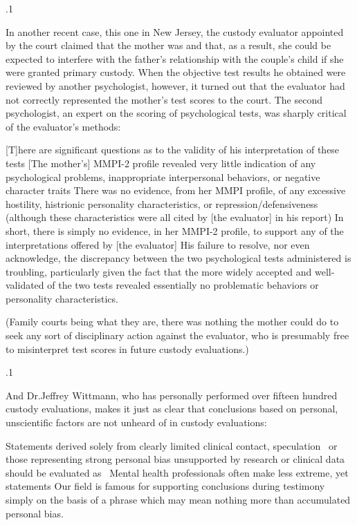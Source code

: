 \documentclass[11pt, twoside]{article}
\begin{document}
{\p.1{%
In another recent case, this one in New Jersey, the custody evaluator
appointed by the court claimed that the mother was  and
that, as a result, she could be expected to interfere with the father’s relationship with the couple’s child if she were granted primary custody.
When the objective test results he obtained were reviewed by another
psychologist, however, it turned out that the evaluator had not correctly
represented the mother’s test scores to the court. The second psychologist, an expert on the scoring of psychological tests, was sharply critical
of the evaluator’s methods:

\begin{blockQuote}
{[T]}here are significant questions as to the validity of his
interpretation of these tests\ellFour{2pt}{2pt} [The mother’s] MMPI-2
profile revealed very little indication of any psychological problems, inappropriate interpersonal behaviors, or negative character
traits\ellFour{2pt}{2pt} There was no evidence, from her MMPI profile, of
any excessive hostility, histrionic personality characteristics, or
repression/defensiveness (although these characteristics were
all cited by [the evaluator] in his report)\ellFour{2pt}{2pt} In short, there is
simply no evidence, in her MMPI-2 profile, to support any of
the interpretations offered by [the evaluator]\ellFour{2pt}{2pt} His failure
to resolve, nor even acknowledge, the discrepancy between the
two psychological tests administered is troubling, particularly
given the fact that the more widely accepted and well-validated
of the two tests revealed essentially no problematic behaviors or
personality characteristics.
\end{blockQuote}

\nip{}%
(Family courts being what they are, there was nothing the mother
could do to seek any sort of disciplinary action against the evaluator,
who is presumably free to misinterpret test scores in future custody
evaluations.)
}%

\p.1{%
And Dr.\@ Jeffrey Wittmann, who has personally performed over fifteen hundred custody evaluations, makes it just as clear that conclusions
based on personal, unscientific factors are not unheard of in custody
evaluations:

\begin{blockQuote}
Statements derived solely from  clearly limited clinical contact, speculation \ellThree{2pt}{2pt}\ or those representing strong personal
bias unsupported by research or clinical data should be evaluated
as  \ellThree{2pt}{2pt}\ Mental health professionals often make less
extreme, yet  statements\ellFour{2pt}{2pt} Our field is famous
for supporting conclusions during testimony simply on the basis
of  a phrase which may mean
nothing more than accumulated personal bias.
\end{blockQuote}

}}
\end{document}

